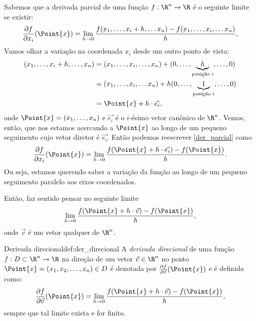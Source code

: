 Sabemos que a derivada parcial de uma função $f:\R^n\to\R$ é o seguinte limite se existir:
\begin{equation}\label{der_parcial}
    \frac{\partial f}{\partial x_i} (\Point{x}) = \lim_{{h \to 0}} \frac{f(x_1,\dots,x_i + h,\dots x_n) - f(x_1,\dots,x_i,\dots x_n)}{h},
\end{equation} 
Vamos olhar a variação na coordenada $x_i$ desde um outro ponto de vista: 
\begin{align*}
(x_1,\dots,x_i + h,\dots, x_n)&=(x_1,\dots,x_i ,\dots, x_n)+(0,\dots,\underbrace{h}_{\textup{posição~}i},\dots,0)\\
&=(x_1,\dots,x_i ,\dots x_n)+h(0,\dots,\underbrace{1}_{\textup{posição~}i},\dots,0)\\
&=\Point{x}+h\cdot \Vec{e_i},
\end{align*}
onde $\Point{x}=(x_1,\dots, x_n)$ e $\Vec{e_i}$ é o $i$-ésimo vetor canônico de $\R^n$. %
Vemos, então, que nos estamos acercando a $\Point{x}$ ao longo de um pequeno seguimento cujo vetor diretor é $\Vec{e_i}$. 
Então podemos reescrever \eqref{der_parcial} como
\begin{equation}\label{der_parcial}
\frac{\partial f}{\partial x_i} (\Point{x}) = \lim_{{h \to 0}} \frac{f(\Point{x}+h\cdot \Vec{e_i}) - f(\Point{x})}{h}.
\end{equation} 
Ou seja, estamos querendo saber a variação da função  ao longo de um pequeno seguimento paralelo aos  eixos coordenados. 

Então, faz sentido pensar no seguinte limite 
\begin{equation}\label{der_parcial}
\lim_{{h \to 0}} \frac{f(\Point{x}+h\cdot \Vec{v}) - f(\Point{x})}{h},
\end{equation} 
onde $\Vec{v}$ é um vetor qualquer de $\R^n$.

\begin{definition}{Derivada direcional}{def:der_direcional}
A \textit{derivada direcional} de uma função \( f:D\subset\R^n\to\R \) na direção de um vetor $\Vec{v}\in\R^n$  no ponto $\Point{x}=(x_1,x_2,\dots,x_n)\in D$ é denotada por \( \frac{\partial f}{\partial \Vec{v}} (\Point{x})\) e é definida como:
\[ \frac{\partial f}{\partial \Vec{v}} (\Point{x}) = \lim_{{h \to 0}} \frac{f(\Point{x}+h\cdot \Vec{v}) - f(\Point{x})}{h},\]
sempre que tal limite exista e for finito. 
\end{definition}

